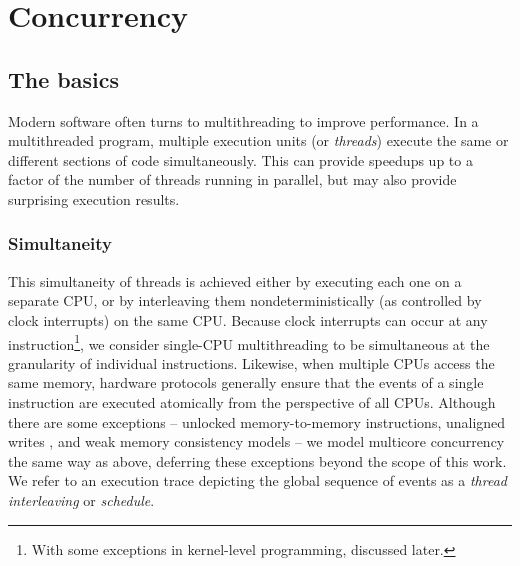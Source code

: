 
\section{Concurrency}
\label{sec:overview-concurrency}


\subsection{The basics}

Modern software often turns to multithreading to improve performance.
In a multithreaded program, multiple execution units (or {\em threads}) execute the same or different sections of code simultaneously.
This can provide speedups up to a factor of the number of threads running in parallel,
but may also provide surprising execution results.

\subsubsection{Simultaneity}
This simultaneity of threads is achieved either by executing each one on a separate CPU, or by interleaving them nondeterministically (as controlled by clock interrupts) on the same CPU.
Because clock interrupts can occur at any instruction\footnote{
	With some exceptions in kernel-level programming, discussed later.
},
we consider single-CPU multithreading to be simultaneous at the granularity of individual instructions.
%
Likewise, when multiple CPUs access the same memory,
hardware protocols generally ensure that the events of a single instruction are executed atomically from the perspective of all CPUs.
Although there are some exceptions --
unlocked memory-to-memory instructions,
unaligned writes \cite{unaligned-writes},
and weak memory consistency models \cite{memory-consistency-models} --
we model multicore concurrency the same way as above,
deferring these exceptions beyond the scope of this work.
We refer to an execution trace depicting the global sequence of events as a {\em thread interleaving} or {\em schedule}.

